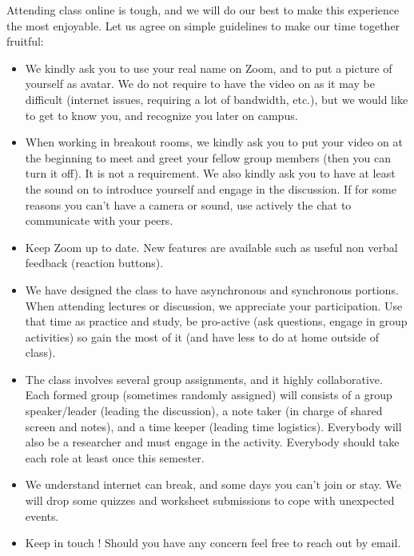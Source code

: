 \documentclass[11pt]{article}
\begin{document}
Attending class online is tough, and we will do our best to make this experience the most enjoyable. Let us agree on simple guidelines to make our time together fruitful:

\begin{itemize}
\item We kindly ask you to use your real name on Zoom, and to put a picture of yourself as avatar. We do not require to have the video on as it may be difficult (internet issues, requiring a lot of bandwidth, etc.), but we would like to get to know you, and recognize you later on campus.
\item When working in breakout rooms, we kindly ask you to put your video on at the beginning to meet and greet your fellow group members (then you can turn it off). It is not a requirement. We also kindly ask you to have at least the sound on to introduce yourself and engage in the discussion. If for some reasons you can't have a camera or sound, use actively the chat to communicate with your peers.
\item Keep Zoom up to date. New features are available such as useful non verbal feedback (reaction buttons).
\item We have designed the class to have asynchronous and synchronous portions. When attending lectures or discussion, we appreciate your participation. Use that time as practice and study, be pro-active (ask questions, engage in group activities) so gain the most of it (and have less to do at home outside of class). 
\item The class involves several group assignments, and it highly collaborative. Each formed group (sometimes randomly assigned) will consists of a group speaker/leader (leading the discussion), a note taker (in charge of shared screen and notes), and a time keeper (leading time logistics). Everybody will also be a researcher and must engage in the activity. Everybody should take each role at least once this semester.
\item We understand internet can break, and some days you can't join or stay. We will drop some quizzes and worksheet submissions to cope with unexpected events. 
\item Keep in touch ! Should you have any concern feel free to reach out by email.
\end{itemize}
\end{document}
